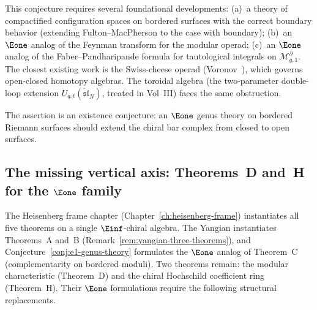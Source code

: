 \begin{remark}[Scope]\label{rem:e1-genus-scope}
This conjecture requires several foundational
developments: (a)~a theory of compactified configuration
spaces on bordered surfaces with the correct boundary
behavior (extending Fulton--MacPherson to the case
with boundary); (b)~an $\Eone$ analog of the Feynman
transform for the modular operad; (c)~an $\Eone$ analog
of the Faber--Pandharipande formula for tautological
integrals on $\mathcal{M}_{g,1}^{\partial}$. The
closest existing work is the Swiss-cheese operad
(Voronov~\cite{Voronov99}), which governs open-closed
homotopy algebras.
The toroidal algebra (the two-parameter double-loop
extension $U_{q,t}(\ddot{\mathfrak{sl}}_N)$, treated in Vol~III) faces the
same obstruction.

The assertion is an existence conjecture: an $\Eone$ genus theory on
bordered Riemann surfaces should extend the chiral bar complex from
closed to open surfaces.
\end{remark}

\subsection{The missing vertical axis: Theorems~D and~H for the \texorpdfstring{$\Eone$}{E1} family}
\label{subsec:yangian-vertical-axis}

The Heisenberg frame chapter (Chapter~\ref{ch:heisenberg-frame})
instantiates all five theorems on a single $\Einf$-chiral algebra.
The Yangian instantiates Theorems~A and~B
(Remark~\ref{rem:yangian-three-theorems}), and
Conjecture~\ref{conj:e1-genus-theory} formulates the $\Eone$ analog
of Theorem~C (complementarity on bordered moduli). Two theorems remain:
the modular characteristic (Theorem~D) and the chiral Hochschild coefficient
ring (Theorem~H). Their $\Eone$ formulations require the following
structural replacements.

